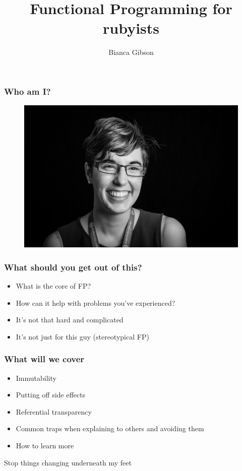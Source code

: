 \documentclass{beamer}
\title{Functional Programming for rubyists}
\author{Bianca Gibson}
\institute{Ruby Conf AU 2016}
\date{}
\begin{document}
\frame{\titlepage}

\begin{frame}
\frametitle{Who am I?}
\begin{figure}[p]
  \includegraphics{./assets/portrait.jpg}
\end{figure}
\end{frame}

\begin{frame}
\frametitle{What should you get out of this?}
\begin{itemize}
\item What is the core of FP?
\item How can it help with problems you've experienced?
\item It's not that hard and complicated
\item It's not just for this guy (stereotypical FP)
\end{itemize}
\end{frame}

\begin{frame}
\frametitle{What will we cover}
\begin{itemize}
\item Immutability
\item Putting off side effects
\item Referential transparency
\item Common traps when explaining to others and avoiding them
\item How to learn more
\end{itemize}
\end{frame}

\begin{frame}
\begin{center}
\Huge Stop things changing underneath my feet
\end{center}
\end{frame}
\end{document}
